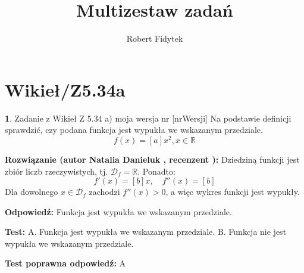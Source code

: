 \documentclass[12pt, a4paper]{article}
\title{Multizestaw zadań}
\author{Robert Fidytek}
\date{}
\theoremstyle{definition} %
\newtheorem{zad}{}
\newcommand{\kategoria}[1]{\section{#1}} %
\newcommand{\zadStart}[1]{\begin{zad}#1\newline} %
\newcommand{\zadStop}{\end{zad}}   %
\newcommand{\rozwStart}[2]{\noindent \textbf{Rozwiązanie (autor #1 , recenzent #2): }\newline} %
\newcommand{\rozwStop}{\newline}                                            %
\newcommand{\odpStart}{\noindent \textbf{Odpowiedź:}\newline}    %
\newcommand{\odpStop}{\newline}                                             %
\newcommand{\testStart}{\noindent \textbf{Test:}\newline} %
\newcommand{\testStop}{\newline} %
\newcommand{\kluczStart}{\noindent \textbf{Test poprawna odpowiedź:}\newline} %
\newcommand{\kluczStop}{\newline} %
\begin{document}
\maketitle

\kategoria{Wikieł/Z5.34a}

\zadStart{Zadanie z Wikieł Z 5.34 a) moja wersja nr [nrWersji]}
Na podstawie definicji sprawdzić, czy podana funkcja jest wypukła we wskazanym przedziale.
$$f(x) = [a]x^2, x \in \mathbb{R}$$
\zadStop

\rozwStart{Natalia Danieluk}{}
Dziedziną funkcji jest zbiór liczb rzeczywistych, tj. $\mathcal{D}_f=\mathbb{R}$. Ponadto:
$$f'(x) = [b]x,\quad f''(x) = [b]$$
Dla dowolnego $x \in \mathcal{D}_f$ zachodzi $f''(x) > 0$, a więc wykres funkcji jest wypukły.
\rozwStop

\odpStart
Funkcja jest wypukła we wskazanym przedziale.
\odpStop

\testStart
A. Funkcja jest wypukła we wskazanym przedziale.
B. Funkcja nie jest wypukła we wskazanym przedziale.
\testStop

\kluczStart
A
\kluczStop
\end{document}
